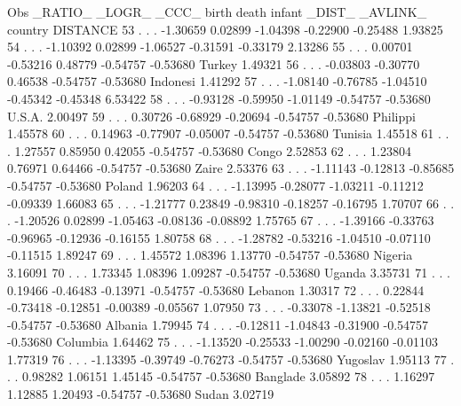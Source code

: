 \documentclass{article}
\begin{document}
\begin{Woutput}
Obs _RATIO_  _LOGR_  _CCC_    birth     death    infant    _DIST_   _AVLINK_  country   DISTANCE
 53    .        .      .    -1.30659   0.02899  -1.04398  -0.22900  -0.25488             1.93825
 54    .        .      .    -1.10392   0.02899  -1.06527  -0.31591  -0.33179             2.13286
 55    .        .      .     0.00701  -0.53216   0.48779  -0.54757  -0.53680  Turkey     1.49321
 56    .        .      .    -0.03803  -0.30770   0.46538  -0.54757  -0.53680  Indonesi   1.41292
 57    .        .      .    -1.08140  -0.76785  -1.04510  -0.45342  -0.45348             6.53422
 58    .        .      .    -0.93128  -0.59950  -1.01149  -0.54757  -0.53680  U.S.A.     2.00497
 59    .        .      .     0.30726  -0.68929  -0.20694  -0.54757  -0.53680  Philippi   1.45578
 60    .        .      .     0.14963  -0.77907  -0.05007  -0.54757  -0.53680  Tunisia    1.45518
 61    .        .      .     1.27557   0.85950   0.42055  -0.54757  -0.53680  Congo      2.52853
 62    .        .      .     1.23804   0.76971   0.64466  -0.54757  -0.53680  Zaire      2.53376
 63    .        .      .    -1.11143  -0.12813  -0.85685  -0.54757  -0.53680  Poland     1.96203
 64    .        .      .    -1.13995  -0.28077  -1.03211  -0.11212  -0.09339             1.66083
 65    .        .      .    -1.21777   0.23849  -0.98310  -0.18257  -0.16795             1.70707
 66    .        .      .    -1.20526   0.02899  -1.05463  -0.08136  -0.08892             1.75765
 67    .        .      .    -1.39166  -0.33763  -0.96965  -0.12936  -0.16155             1.80758
 68    .        .      .    -1.28782  -0.53216  -1.04510  -0.07110  -0.11515             1.89247
 69    .        .      .     1.45572   1.08396   1.13770  -0.54757  -0.53680  Nigeria    3.16091
 70    .        .      .     1.73345   1.08396   1.09287  -0.54757  -0.53680  Uganda     3.35731
 71    .        .      .     0.19466  -0.46483  -0.13971  -0.54757  -0.53680  Lebanon    1.30317
 72    .        .      .     0.22844  -0.73418  -0.12851  -0.00389  -0.05567             1.07950
 73    .        .      .    -0.33078  -1.13821  -0.52518  -0.54757  -0.53680  Albania    1.79945
 74    .        .      .    -0.12811  -1.04843  -0.31900  -0.54757  -0.53680  Columbia   1.64462
 75    .        .      .    -1.13520  -0.25533  -1.00290  -0.02160  -0.01103             1.77319
 76    .        .      .    -1.13395  -0.39749  -0.76273  -0.54757  -0.53680  Yugoslav   1.95113
 77    .        .      .     0.98282   1.06151   1.45145  -0.54757  -0.53680  Banglade   3.05892
 78    .        .      .     1.16297   1.12885   1.20493  -0.54757  -0.53680  Sudan      3.02719


\end{Woutput}
\end{document}
